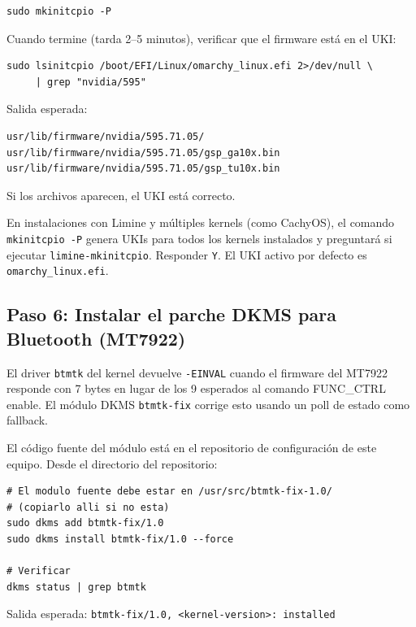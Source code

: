 \documentclass[12pt,a4paper]{article}
\begin{document}
\begin{lstlisting}[style=bash]
sudo mkinitcpio -P
\end{lstlisting}

Cuando termine (tarda 2--5 minutos), verificar que el firmware está en el UKI:

\begin{lstlisting}[style=bash]
sudo lsinitcpio /boot/EFI/Linux/omarchy_linux.efi 2>/dev/null \
     | grep "nvidia/595"
\end{lstlisting}

Salida esperada:
\begin{lstlisting}
usr/lib/firmware/nvidia/595.71.05/
usr/lib/firmware/nvidia/595.71.05/gsp_ga10x.bin
usr/lib/firmware/nvidia/595.71.05/gsp_tu10x.bin
\end{lstlisting}

Si los archivos aparecen, el UKI está correcto.

\begin{nota}
En instalaciones con Limine y múltiples kernels (como CachyOS), el comando
\texttt{mkinitcpio -P} genera UKIs para todos los kernels instalados y
preguntará si ejecutar \texttt{limine-mkinitcpio}. Responder \texttt{Y}.
El UKI activo por defecto es \texttt{omarchy\_linux.efi}.
\end{nota}

\subsection{Paso 6: Instalar el parche DKMS para Bluetooth (MT7922)}

El driver \texttt{btmtk} del kernel devuelve \texttt{-EINVAL} cuando el
firmware del MT7922 responde con 7 bytes en lugar de los 9 esperados al
comando FUNC\_CTRL enable. El módulo DKMS \texttt{btmtk-fix} corrige esto
usando un poll de estado como fallback.

El código fuente del módulo está en el repositorio de configuración de este
equipo. Desde el directorio del repositorio:

\begin{lstlisting}[style=bash]
# El modulo fuente debe estar en /usr/src/btmtk-fix-1.0/
# (copiarlo alli si no esta)
sudo dkms add btmtk-fix/1.0
sudo dkms install btmtk-fix/1.0 --force

# Verificar
dkms status | grep btmtk
\end{lstlisting}

Salida esperada: \texttt{btmtk-fix/1.0, <kernel-version>: installed}
\end{document}
